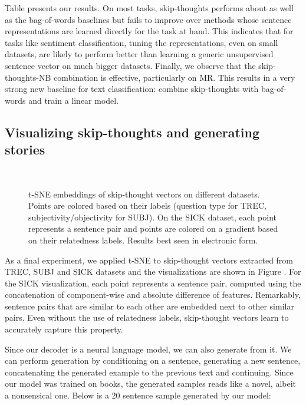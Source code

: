 \documentclass{article} \usepackage{nips15submit_e,times}
\begin{document}
Table presents our results. On most tasks, skip-thoughts performs about as well as the bag-of-words baselines but fails to improve over methods whose sentence representations are learned directly for the task at hand. This indicates that for tasks like sentiment classification, tuning the representations, even on small datasets, are likely to perform better than learning a generic unsupervised sentence vector on much bigger datasets. Finally, we observe that the skip-thoughts-NB combination is effective, particularly on MR. This results in a very strong new baseline for text classification: combine skip-thoughts with bag-of-words and train a linear model.


\subsection{Visualizing skip-thoughts and generating stories}

\begin{figure}[t]
\vspace{-3mm}
  \centering
  \mbox{
    \quad
   \label{fig:tsne}
  }
  \vspace{-4mm}
  \caption{t-SNE embeddings of skip-thought vectors on different datasets. Points are colored based on their labels (question type for TREC, subjectivity/objectivity for SUBJ). On the SICK dataset, each point represents a sentence pair and points are colored on a gradient based on their relatedness labels. Results best seen in electronic form.}
  \vspace{-1mm}
\label{fig:tsne}
\end{figure}


As a final experiment, we applied t-SNE \cite{van2008visualizing} to skip-thought vectors extracted from TREC, SUBJ and SICK datasets and the visualizations are shown in Figure . For the SICK visualization, each point represents a sentence pair, computed using the concatenation of component-wise and absolute difference of features. Remarkably, sentence pairs that are similar to each other are embedded next to other similar pairs. Even without the use of relatedness labels, skip-thought vectors learn to accurately capture this property.

Since our decoder is a neural language model, we can also generate from it. We can perform generation by conditioning on a sentence, generating a new sentence, concatenating the generated example to the previous text and continuing. Since our model was trained on books, the generated samples reads like a novel, albeit a nonsensical one. Below is a 20 sentence sample generated by our model:
\end{document}
